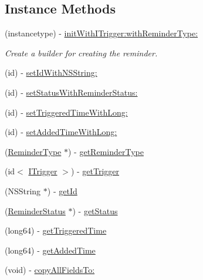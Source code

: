 \subsection*{Instance Methods}
\begin{DoxyCompactItemize}
\item 
(instancetype) -\/ \hyperlink{interface_base_reminder___base_reminder_builder_ade1dccf97379c2af6b1c92837f429588}{init\+With\+I\+Trigger\+:with\+Reminder\+Type\+:}
\begin{DoxyCompactList}\small\item\em Create a builder for creating the reminder. \end{DoxyCompactList}\item 
(id) -\/ \hyperlink{interface_base_reminder___base_reminder_builder_a3ac00e56cf8bed416653e952b6612bbc}{set\+Id\+With\+N\+S\+String\+:}
\item 
(id) -\/ \hyperlink{interface_base_reminder___base_reminder_builder_aab80e6f3301368d76fbe20aa7177c58d}{set\+Status\+With\+Reminder\+Status\+:}
\item 
(id) -\/ \hyperlink{interface_base_reminder___base_reminder_builder_a6d59ab4999e460ff2d1640dbb867cb74}{set\+Triggered\+Time\+With\+Long\+:}
\item 
(id) -\/ \hyperlink{interface_base_reminder___base_reminder_builder_a0364548930e0d9fa1326e824edaed650}{set\+Added\+Time\+With\+Long\+:}
\item 
(\hyperlink{interface_reminder_type}{Reminder\+Type} $\ast$) -\/ \hyperlink{interface_base_reminder___base_reminder_builder_a34c3103019755ab83ef2a6a34354f326}{get\+Reminder\+Type}
\item 
(id$<$ \hyperlink{protocol_i_trigger-p}{I\+Trigger} $>$) -\/ \hyperlink{interface_base_reminder___base_reminder_builder_adb780f8ff6041c4119540a7808fac80d}{get\+Trigger}
\item 
(N\+S\+String $\ast$) -\/ \hyperlink{interface_base_reminder___base_reminder_builder_a895d56319423b7467cffb31474555243}{get\+Id}
\item 
(\hyperlink{interface_reminder_status}{Reminder\+Status} $\ast$) -\/ \hyperlink{interface_base_reminder___base_reminder_builder_ae782d50c06f2764716008798b039a63e}{get\+Status}
\item 
(long64) -\/ \hyperlink{interface_base_reminder___base_reminder_builder_a0882927a870b4c4d690e237e955c3476}{get\+Triggered\+Time}
\item 
(long64) -\/ \hyperlink{interface_base_reminder___base_reminder_builder_a3e58f2a2c0e051082da4aee34ec1d4f9}{get\+Added\+Time}
\item 
(void) -\/ \hyperlink{interface_base_reminder___base_reminder_builder_a7acf169a4bc4e2c9f3d86ed7c2e6b243}{copy\+All\+Fields\+To\+:}
\end{DoxyCompactItemize}
